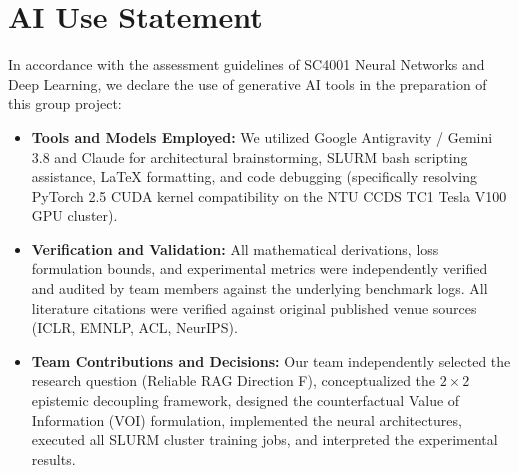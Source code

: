 \section{AI Use Statement}
\label{sec:ai_use_statement}

In accordance with the assessment guidelines of SC4001 Neural Networks and Deep Learning, we declare the use of generative AI tools in the preparation of this group project:
\begin{itemize}
    \item \textbf{Tools and Models Employed:} We utilized Google Antigravity / Gemini 3.8 and Claude for architectural brainstorming, SLURM bash scripting assistance, LaTeX formatting, and code debugging (specifically resolving PyTorch 2.5 CUDA kernel compatibility on the NTU CCDS TC1 Tesla V100 GPU cluster).
    \item \textbf{Verification and Validation:} All mathematical derivations, loss formulation bounds, and experimental metrics were independently verified and audited by team members against the underlying benchmark logs. All literature citations were verified against original published venue sources (ICLR, EMNLP, ACL, NeurIPS).
    \item \textbf{Team Contributions and Decisions:} Our team independently selected the research question (Reliable RAG Direction F), conceptualized the $2 \times 2$ epistemic decoupling framework, designed the counterfactual Value of Information (VOI) formulation, implemented the neural architectures, executed all SLURM cluster training jobs, and interpreted the experimental results.
\end{itemize}
